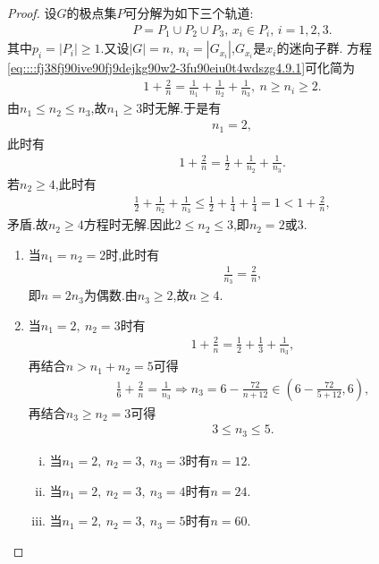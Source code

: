 \documentclass[../../main.tex]{subfiles}%
\begin{document}
\begin{proof}
设$G$的极点集$P$可分解为如下三个轨道:
\begin{align*}
P=P_1\cup P_2\cup P_3,\,x_i\in P_i,\,i=1,2,3.
\end{align*}
其中$p_i=|P_i|\geqslant1.$又设$|G|=n,\ n_i=|G_{x_i}|$,$G_{x_i}$是$x_i$的迷向子群.
方程\eqref{eq::::fj38fj90ive90fj9dejkg90w2-3fu90eiu0t4wdszg4.9.1}可化简为
\begin{align*}
1+\frac{2}{n}=\frac{1}{n_1}+\frac{1}{n_2}+\frac{1}{n_3},\ n\geqslant n_i\geqslant 2.
\end{align*}
由$n_1\leqslant n_2\leqslant n_3$,故$n_1\geqslant 3$时无解.于是有
\begin{align*}
n_1=2,
\end{align*}
此时有
\begin{align*}
1+\frac{2}{n}=\frac{1}{2}+\frac{1}{n_2}+\frac{1}{n_3}.
\end{align*}
若$n_2\geqslant 4$,此时有
\begin{align*}
\frac{1}{2}+\frac{1}{n_2}+\frac{1}{n_3}\leqslant\frac{1}{2}+\frac{1}{4}+\frac{1}{4}=1<1+\frac{2}{n},
\end{align*}
矛盾.故$n_2\geqslant 4$方程时无解.因此$2\leqslant n_2\leqslant3$,即$n_2=2\text{或}3$.
\begin{enumerate}[(1)]
\item 当$n_1=n_2=2$时,此时有
\begin{align*}
\frac{1}{n_3}=\frac{2}{n},
\end{align*}
即$n=2n_3$为偶数.由$n_3\geqslant 2$,故$n\geqslant 4$.

\item 当$n_1=2,\ n_2=3$时有
\begin{align*}
1+\frac{2}{n}=\frac{1}{2}+\frac{1}{3}+\frac{1}{n_3},
\end{align*}
再结合$n>n_1+n_2=5$可得
\begin{align*}
\frac{1}{6}+\frac{2}{n}=\frac{1}{n_3}\Longrightarrow n_3=6-\frac{72}{n+12}\in ( 6-\frac{72}{5+12},6),
\end{align*}
再结合$n_3\geqslant n_2=3$可得
\begin{align*}
3\leqslant n_3\leqslant 5.
\end{align*}
\begin{enumerate}[(i)]
\item 当$n_1=2,\ n_2=3,\ n_3=3$时有$n=12$.

\item 当$n_1=2,\ n_2=3,\ n_3=4$时有$n=24$.

\item 当$n_1=2,\ n_2=3,\ n_3=5$时有$n=60$.
\end{enumerate}
\end{enumerate}

\end{proof}
\end{document}

